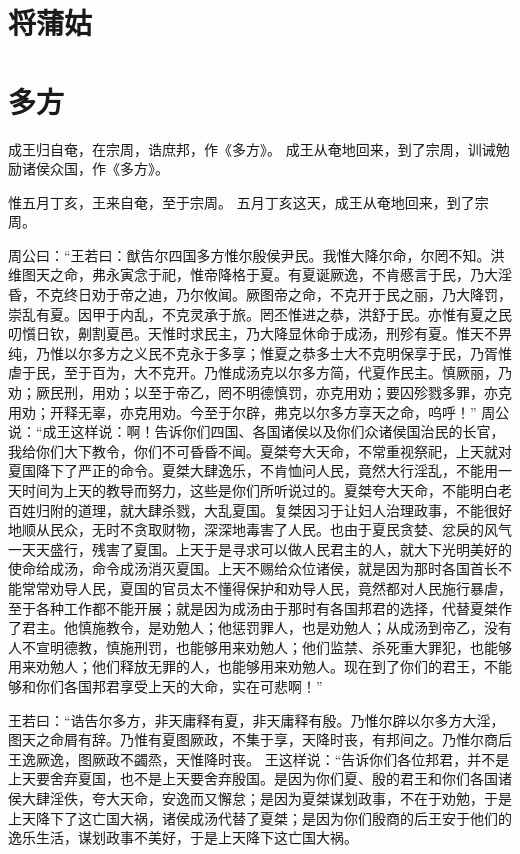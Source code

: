 \documentclass[12pt,UTF8]{ctexbook}
\begin{document}
\chapter{将蒲姑}

\chapter{多方}

成王归自奄，在宗周，诰庶邦，作《多方》。
成王从奄地回来，到了宗周，训诫勉励诸侯众国，作《多方》。

惟五月丁亥，王来自奄，至于宗周。
五月丁亥这天，成王从奄地回来，到了宗周。

周公曰：“王若曰：猷告尔四国多方惟尔殷侯尹民。我惟大降尔命，尔罔不知。洪维图天之命，弗永寅念于祀，惟帝降格于夏。有夏诞厥逸，不肯慼言于民，乃大淫昏，不克终日劝于帝之迪，乃尔攸闻。厥图帝之命，不克开于民之丽，乃大降罚，崇乱有夏。因甲于内乱，不克灵承于旅。罔丕惟进之恭，洪舒于民。亦惟有夏之民叨懫日钦，劓割夏邑。天惟时求民主，乃大降显休命于成汤，刑殄有夏。惟天不畀纯，乃惟以尔多方之义民不克永于多享；惟夏之恭多士大不克明保享于民，乃胥惟虐于民，至于百为，大不克开。乃惟成汤克以尔多方简，代夏作民主。慎厥丽，乃劝；厥民刑，用劝；以至于帝乙，罔不明德慎罚，亦克用劝；要囚殄戮多罪，亦克用劝；开释无辜，亦克用劝。今至于尔辟，弗克以尔多方享天之命，呜呼！”
周公说：“成王这样说：啊！告诉你们四国、各国诸侯以及你们众诸侯国治民的长官，我给你们大下教令，你们不可昏昏不闻。夏桀夸大天命，不常重视祭祀，上天就对夏国降下了严正的命令。夏桀大肆逸乐，不肯恤问人民，竟然大行淫乱，不能用一天时间为上天的教导而努力，这些是你们所听说过的。夏桀夸大天命，不能明白老百姓归附的道理，就大肆杀戮，大乱夏国。复桀因习于让妇人治理政事，不能很好地顺从民众，无时不贪取财物，深深地毒害了人民。也由于夏民贪婪、忿戾的风气一天天盛行，残害了夏国。上天于是寻求可以做人民君主的人，就大下光明美好的使命给成汤，命令成汤消灭夏国。上天不赐给众位诸侯，就是因为那时各国首长不能常常劝导人民，夏国的官员太不懂得保护和劝导人民，竟然都对人民施行暴虐，至于各种工作都不能开展；就是因为成汤由于那时有各国邦君的选择，代替夏桀作了君主。他慎施教令，是劝勉人；他惩罚罪人，也是劝勉人；从成汤到帝乙，没有人不宣明德教，慎施刑罚，也能够用来劝勉人；他们监禁、杀死重大罪犯，也能够用来劝勉人；他们释放无罪的人，也能够用来劝勉人。现在到了你们的君王，不能够和你们各国邦君享受上天的大命，实在可悲啊！”

王若曰：“诰告尔多方，非天庸释有夏，非天庸释有殷。乃惟尔辟以尔多方大淫，图天之命屑有辞。乃惟有夏图厥政，不集于享，天降时丧，有邦间之。乃惟尔商后王逸厥逸，图厥政不蠲烝，天惟降时丧。
王这样说：“告诉你们各位邦君，并不是上天要舍弃夏国，也不是上天要舍弃殷国。是因为你们夏、殷的君王和你们各国诸侯大肆淫佚，夸大天命，安逸而又懈怠；是因为夏桀谋划政事，不在于劝勉，于是上天降下了这亡国大祸，诸侯成汤代替了夏桀；是因为你们殷商的后王安于他们的逸乐生活，谋划政事不美好，于是上天降下这亡国大祸。
\end{document}
